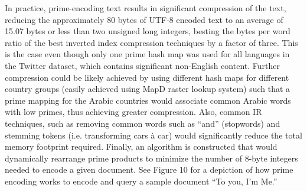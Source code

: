 \documentclass[twocolumn]{article}
\begin{document}
In practice, prime-encoding text results in significant compression of the text, reducing the approximately 80 bytes of UTF-8 encoded text to an average of 15.07 bytes or less than two unsigned long integers, besting the bytes per word ratio of the best inverted index compression techniques by a factor of three. This is the case even though only one prime hash map was used for all languages in the Twitter dataset, which contains significant non-English content. Further compression could be likely achieved by using different hash maps for different country groups (easily achieved using MapD raster lookup system) such that a prime mapping for the Arabic countries would associate common Arabic words with low primes, thus achieving greater compression. Also, common IR techniques, such as removing common words such as “and” (stopwords) and stemming tokens (i.e. transforming cars à car) would significantly reduce the total memory footprint required. Finally, an algorithm is constructed that would dynamically rearrange prime products to minimize the number of 8-byte integers needed to encode a given document. See Figure 10 for a depiction of how prime encoding works to encode and query a sample document “To you, I’m Me.”

\end{document}
